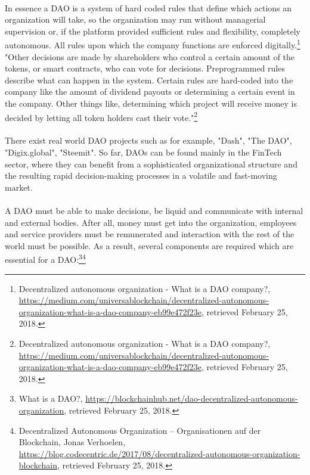 \documentclass{scrartcl}
\begin{document}
     \paragraph{}
     In essence a DAO is a system of hard coded rules that define which actions an organization will take, so the organization may run without managerial supervision or, if the platform provided sufficient rules and flexibility, completely autonomous. All rules upon which the company functions are enforced digitally.\footnote{Decentralized autonomous organization - What is a DAO company?, \url{https://medium.com/universablockchain/decentralized-autonomous-organization-what-is-a-dao-company-eb99e472f23e}, retrieved February 25, 2018.} "Other decisions are made by shareholders who control a certain amount of the tokens, or smart contracts, who can vote for decisions. Preprogrammed rules describe what can happen in the system. Certain rules are hard-coded into the company like the amount of dividend payouts or determining a certain event in the company. Other things like, determining which project will receive money is decided by letting all token holders cast their vote."\footnote{Decentralized autonomous organization - What is a DAO company?, \url{https://medium.com/universablockchain/decentralized-autonomous-organization-what-is-a-dao-company-eb99e472f23e}, retrieved February 25, 2018.}
     
     \paragraph{}
     There exist real world DAO projects such as for example, "Dash", "The DAO", "Digix.global", "Steemit". So far, DAOs can be found mainly in the FinTech sector, where they can benefit from a sophisticated organizational structure and the resulting rapid decision-making processes in a volatile and fast-moving market.
     
     \paragraph{}
     A DAO must be able to make decisions, be liquid and communicate with internal and external bodies. After all, money must get into the organization, employees and service providers must be remunerated and interaction with the rest of the world must be possible. As a result, several components are required which are essential for a DAO:\footnote{What is a DAO?, \url{https://blockchainhub.net/dao-decentralized-autonomous-organization}, retrieved February 25, 2018.}\footnote{Decentralized Autonomous Organization – Organisationen auf der Blockchain, Jonas Verhoelen, \url{https://blog.codecentric.de/2017/08/decentralized-autonomous-organization-blockchain}, retrieved February 25, 2018.}
    
\end{document}
